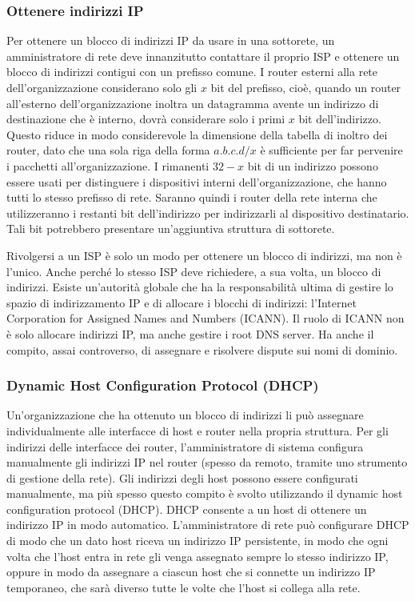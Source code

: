 \subsubsection{Ottenere indirizzi IP}
Per ottenere un blocco di indirizzi IP da usare in una sottorete, un amministratore di
rete deve innanzitutto contattare il proprio ISP e ottenere un blocco di indirizzi contigui con un prefisso comune. I router esterni alla rete dell'organizzazione considerano solo gli $x$ bit del prefisso, cioè, quando un router all'esterno dell'organizzazione inoltra un datagramma avente un indirizzo di destinazione che è interno, dovrà considerare solo i primi $x$ bit dell'indirizzo. Questo riduce in modo considerevole la dimensione della tabella di inoltro dei router, dato che una sola riga della forma $a.b.c.d/x$ è sufficiente per far pervenire i pacchetti all'organizzazione. I rimanenti $32-x$ bit di un indirizzo possono essere usati per distinguere i dispositivi interni dell'organizzazione, che hanno tutti lo stesso prefisso di rete. Saranno quindi i router della rete interna che utilizzeranno i restanti bit dell'indirizzo per indirizzarli al dispositivo destinatario. Tali bit potrebbero presentare un'aggiuntiva struttura di sottorete.

Rivolgersi a un ISP è solo un modo per ottenere un blocco di indirizzi, ma non è l'unico. Anche perché lo stesso ISP deve richiedere, a sua volta, un blocco di indirizzi. Esiste un'autorità globale che ha la responsabilità ultima di gestire lo spazio di indirizzamento IP e di allocare i blocchi di indirizzi: l'Internet Corporation for Assigned Names and Numbers (ICANN). Il ruolo di ICANN non è solo allocare indirizzi IP, ma anche gestire i root DNS server. Ha anche il compito, assai controverso, di assegnare e risolvere dispute sui nomi di dominio.

\subsubsection{Dynamic Host Configuration Protocol (DHCP)}
Un'organizzazione che ha ottenuto un blocco di indirizzi li può assegnare individualmente alle interfacce di host e router nella propria struttura. Per gli indirizzi delle interfacce dei router, l'amministratore di sistema configura manualmente gli indirizzi IP nel router (spesso da remoto, tramite uno strumento di gestione della rete). Gli indirizzi degli host possono essere configurati manualmente, ma più spesso questo compito è svolto utilizzando il dynamic host configuration protocol (DHCP). DHCP consente a un host di ottenere un indirizzo IP in modo automatico. L'amministratore di rete può configurare DHCP di modo che un dato host riceva un indirizzo IP persistente, in modo che ogni volta che l'host entra in rete gli venga assegnato sempre lo stesso indirizzo IP, oppure in modo da assegnare a ciascun host che si connette un indirizzo IP temporaneo, che sarà diverso tutte le volte che l'host si collega alla rete. 

